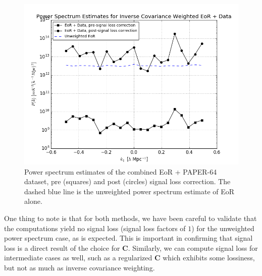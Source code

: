 \documentclass[preprint2,numberedappendix,tighten]{aastex6}  %
\newcommand{\cc}[1]{{\color{purple} \textbf{[CC: #1]}}}
\begin{document}
\begin{figure}
	\centering
	\includegraphics[width=\columnwidth]{plots/sigloss_beforeafter.png}
	\caption{Power spectrum estimates of the combined EoR + PAPER-64 dataset, pre (squares) and post (circles) signal loss correction. The dashed blue line is the unweighted power spectrum estimate of EoR alone.}
	\label{fig:sigloss_beforeafter}
\end{figure}

One thing to note is that for both methods, we have been careful to validate that the computations yield no signal loss (signal loss factors of $1$) for the unweighted power spectrum case, as is expected. This is important in confirming that signal loss is a direct result of the choice for $\textbf{C}$. Similarly, we can compute signal loss for intermediate cases as well, such as a regularized $\textbf{C}$ which exhibits some lossiness, but not as much as inverse covariance weighting.


\end{document}
